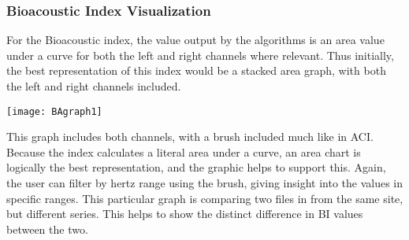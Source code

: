\subsubsection{Bioacoustic Index Visualization}
For the Bioacoustic index, the value output by the algorithms is an area value under a curve for both the left and right channels where relevant. Thus initially, the best representation of this index would be a stacked area graph, with both the left and right channels included.\\

\begin{center}
	\texttt{[image: BAgraph1]} \\[12pt]
\end{center}
This graph includes both channels, with a brush included much like in ACI. Because the index calculates a literal area under a curve, an area chart is logically the best representation, and the graphic helps to support this. Again, the user can filter by hertz range using the brush, giving insight into the values in specific ranges. This particular graph is comparing two files in from the same site, but different series. This helps to show the distinct difference in BI values between the two.\\
